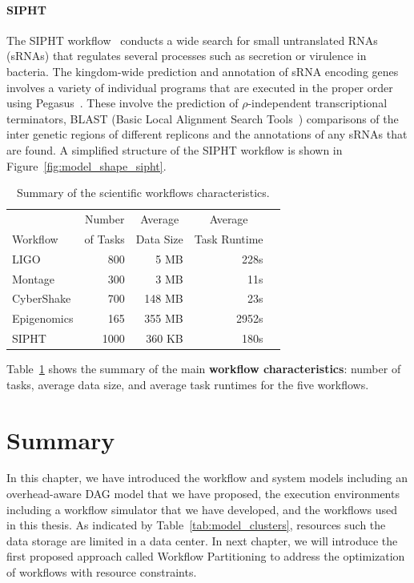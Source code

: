 \paragraph{\textbf{SIPHT}}
The SIPHT workflow~\cite{SIPHT} conducts a wide search for small untranslated RNAs (sRNAs) that regulates several processes such as secretion or virulence in bacteria. The kingdom-wide prediction and annotation of sRNA encoding genes involves a variety of individual programs that are executed in the proper order using Pegasus~\cite{Deelman2004}. These involve the prediction of $\rho$-independent transcriptional terminators, BLAST (Basic Local Alignment Search Tools~\cite{BLAST}) comparisons of the inter genetic regions of different replicons and the annotations of any sRNAs that are found. A simplified structure of the SIPHT workflow is shown in Figure~\ref{fig:model_shape_sipht}. 




\begin{table}[!htb]
	\setlength{\tabcolsep}{11pt}
	\centering
	\small
	\begin{tabular}{lrrrr}
		\hline
		 & \multicolumn{1}{c}{Number} & \multicolumn{1}{c}{Average} &  \multicolumn{1}{c}{Average} \\
		Workflow	& of Tasks	 & Data Size & Task Runtime \\
		\hline
		LIGO 		&800		& 5 MB	& 228s\\
		Montage 		&300		&3 MB	&11s\\
		CyberShake 	&700		&148 MB 	& 23s\\
		Epigenomics 	&165 	& 355 MB	& 2952s\\
		SIPHT		&1000	& 360 KB 	& 180s\\
		\hline
	\end{tabular}
	\caption{Summary of the scientific workflows characteristics.}
	\label{tab:model_workflows}
\end{table} 

Table~\ref{tab:model_workflows} shows the summary of the main \textbf{workflow characteristics}: number of tasks, average data size, and average task runtimes for the five workflows. 

\section{Summary}

In this chapter, we have introduced the workflow and system models including an overhead-aware DAG model that we have proposed, the execution environments including a workflow simulator that we have developed, and the workflows used in this thesis. As indicated by Table~\ref{tab:model_clusters}, resources such the data storage are limited in a data center. In next chapter, we will introduce the first proposed approach called Workflow Partitioning to address the optimization of workflows with resource constraints. 
